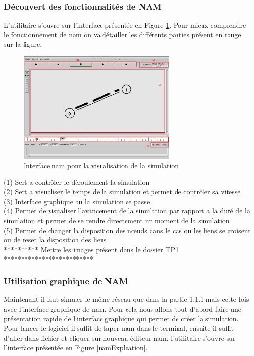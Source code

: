 \documentclass[11pt]{article}
\begin{document}
\subsubsection{Découvert des fonctionnalités de NAM}
L'utilitaire s'ouvre sur l'interface présentée en Figure \ref{namVisu}. Pour mieux comprendre le fonctionnement de nam on va détailler les différents parties présent en rouge sur la figure.

\begin{figure}[H]
	\begin{center}
		\includegraphics[width=0.7\textwidth]{assets/tp1/nam-visualisation1.png}
	\end{center}
	\caption{Interface nam pour la visualisation de la simulation}
	\label{namVisu}
\end{figure}

\noindent
(1) Sert a contrôler le déroulement la simulation \\
(2) Sert a visualiser le temps de la simulation et permet de contrôler sa vitesse\\
(3) Interface graphique ou la simulation se passe \\
(4) Permet de visualiser l'avancement de la simulation par rapport a la duré de la simulation et permet de se rendre directement un moment de la simulation\\
(5) Permet de changer la disposition des nœuds dans le cas ou les liens se croisent ou de reset la disposition des liens\\


********** Mettre les images présent dans le dossier TP1 **************************

\subsubsection{Utilisation graphique de NAM}

Maintenant il faut simuler le même réseau que dans la partie 1.1.1 mais cette fois avec l’interface graphique de nam. Pour cela nous allons tout d'abord faire une présentation rapide de l'interface graphique qui permet de créer la simulation. Pour lancer le logiciel il suffit de taper nam dans le terminal, ensuite il suffit d'aller dans fichier et cliquer sur nouveau éditeur nam,  l'utilitaire s'ouvre sur l'interface présentée en Figure \ref{namExplcation}.
\end{document}
